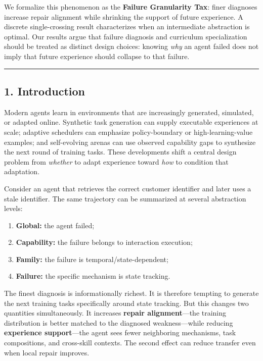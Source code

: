 \documentclass[
]{article}
\providecommand{\tightlist}{%
  \setlength{\itemsep}{0pt}\setlength{\parskip}{0pt}}
\begin{document}
We formalize this phenomenon as the \textbf{Failure Granularity Tax}:
finer diagnoses increase repair alignment while shrinking the support of
future experience. A discrete single-crossing result characterizes when
an intermediate abstraction is optimal. Our results argue that failure
diagnosis and curriculum specialization should be treated as distinct
design choices: knowing \emph{why} an agent failed does not imply that
future experience should collapse to that failure.

\begin{center}\rule{0.5\linewidth}{0.5pt}\end{center}

\subsection{1. Introduction}\label{introduction}

Modern agents learn in environments that are increasingly generated,
simulated, or adapted online. Synthetic task generation can supply
executable experiences at scale; adaptive schedulers can emphasize
policy-boundary or high-learning-value examples; and self-evolving
arenas can use observed capability gaps to synthesize the next round of
training tasks. These developments shift a central design problem from
\emph{whether} to adapt experience toward \emph{how} to condition that
adaptation.

Consider an agent that retrieves the correct customer identifier and
later uses a stale identifier. The same trajectory can be summarized at
several abstraction levels:

\begin{enumerate}
\def\labelenumi{\arabic{enumi}.}
\tightlist
\item
  \textbf{Global:} the agent failed;
\item
  \textbf{Capability:} the failure belongs to interaction execution;
\item
  \textbf{Family:} the failure is temporal/state-dependent;
\item
  \textbf{Failure:} the specific mechanism is state tracking.
\end{enumerate}

The finest diagnosis is informationally richest. It is therefore
tempting to generate the next training tasks specifically around state
tracking. But this changes two quantities simultaneously. It increases
\textbf{repair alignment}---the training distribution is better matched
to the diagnosed weakness---while reducing \textbf{experience
support}---the agent sees fewer neighboring mechanisms, task
compositions, and cross-skill contexts. The second effect can reduce
transfer even when local repair improves.
\end{document}
